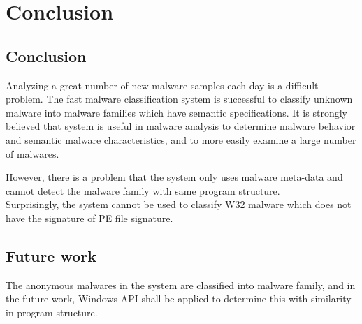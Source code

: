

\chapter{Conclusion}\label{chap:7}
\section{Conclusion}
Analyzing a great number of new malware samples each day is a difficult problem. The fast malware classification system is successful to classify unknown malware into malware families which have semantic specifications. It is strongly believed that system is useful in malware analysis to determine malware behavior and semantic malware characteristics, and to more easily examine a large number of malwares.

However, there is a problem that the system only uses malware meta-data and cannot detect the malware family with same program structure.\\
Surprisingly, the system cannot be used to classify W32 malware which does not have the signature of PE file signature. 
 
\section{Future work}
The anonymous malwares in the system are classified into malware family, and in the future work, Windows API shall be applied to determine this with similarity in program structure. 